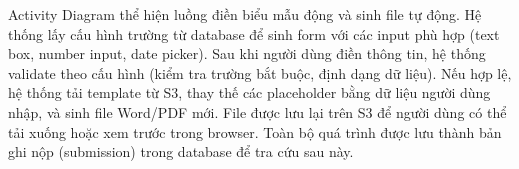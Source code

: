     Activity Diagram thể hiện luồng điền biểu mẫu động và sinh file tự động. Hệ thống lấy cấu hình trường từ database để sinh form với các input phù hợp (text box, number input, date picker). Sau khi người dùng điền thông tin, hệ thống validate theo cấu hình (kiểm tra trường bắt buộc, định dạng dữ liệu). Nếu hợp lệ, hệ thống tải template từ S3, thay thế các placeholder bằng dữ liệu người dùng nhập, và sinh file Word/PDF mới. File được lưu lại trên S3 để người dùng có thể tải xuống hoặc xem trước trong browser. Toàn bộ quá trình được lưu thành bản ghi nộp (submission) trong database để tra cứu sau này.
